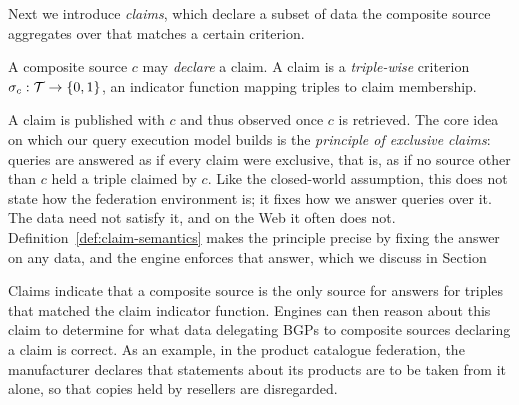 Next we introduce \emph{claims}, which declare a subset of data the composite source
aggregates over that matches a certain criterion. 

\begin{definition}[Claim]
\label{def:claim}
A composite source $c$ may \emph{declare} a claim. A claim is a \emph{triple-wise}
criterion $\sigma_c : \mathcal{T} \to \{0, 1\}$, an indicator function mapping triples to 
claim membership.

\end{definition}


A claim is published with $c$ and thus observed once $c$ is retrieved. 
The core idea on which our query execution model builds is the \emph{principle of
exclusive claims}: queries are answered as if every claim were exclusive, that is, as if
no source other than $c$ held a triple claimed by $c$.
Like the closed-world assumption, this does not state how the federation environment
is; it fixes how we answer queries over it. The data need not satisfy it, and on the Web
it often does not. Definition~\ref{def:claim-semantics} makes the principle precise by
fixing the answer on any data, and the engine enforces that answer, which we discuss in
Section~



Claims indicate that a composite source is the only source for answers for triples that matched
the claim indicator function. Engines can then reason about this claim to determine
for what data delegating BGPs to composite sources declaring a claim is correct.
As an example, in the product catalogue federation,
the manufacturer declares that statements about its products are to be taken from it
alone, so that copies held by resellers are disregarded.

